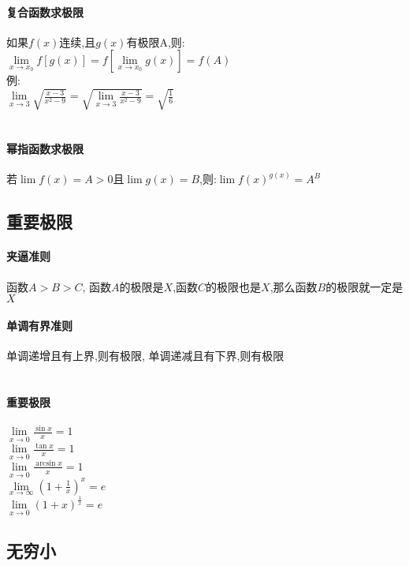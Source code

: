 \documentclass{article}
\begin{document}
\begin{flushleft}
	\paragraph{复合函数求极限}
	如果$f(x)$连续,且$g(x)$有极限A,则:\\
	$\lim\limits_{x\to x_0} f[g(x)]=f[\lim\limits_{x\to x_0}g(x)]=f(A)$\\
	例:\\
	$\lim\limits_{x\to 3} \sqrt{\frac{x-3}{x^2-9}}= \sqrt{\lim\limits_{x\to 3} \frac{x-3}{x^2-9}}=\sqrt{\frac{1}{6}}$\\
	~\\
	\paragraph{幂指函数求极限}
	若$\lim f(x)=A>0$且$\lim g(x)=B$,则:$\lim f(x)^{g(x)}=A^B$\\
	
	\subsection{重要极限}
	
	\paragraph{夹逼准则}
	函数$A>B>C$, 函数$A$的极限是$X$,函数$C$的极限也是$X$,那么函数$B$的极限就一定是$X$\\
	\paragraph{单调有界准则}
	单调递增且有上界,则有极限, 单调递减且有下界,则有极限\\
	~\\
	\paragraph{重要极限}
	$\lim\limits_{x\to 0} \frac{\sin x}{x}=1$\\
	$\lim\limits_{x\to 0} \frac{\tan x}{x}=1$\\
	$\lim\limits_{x\to 0} \frac{\arcsin x}{x}=1$\\
	$\lim\limits_{x\to \infty} (1+\frac{1}{x})^x=e$\\
	$\lim\limits_{x\to 0} (1+x)^{\frac{1}{x}}=e$\\
	
	\subsection{无穷小}
	

\end{flushleft}
\end{document}
